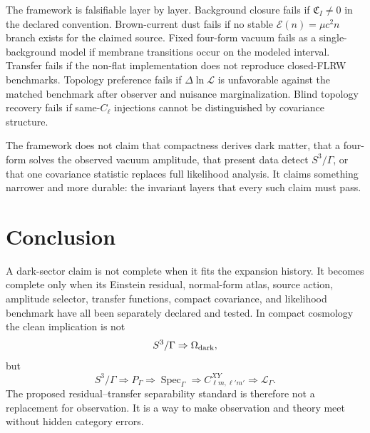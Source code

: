 \documentclass[
  aps,
  prd,
  reprint,
  superscriptaddress,
  floatfix,
  nofootinbib,
  longbibliography
]{revtex4-2}
\theoremstyle{plain}
\theoremstyle{definition}
\theoremstyle{remark}
\newcommand{\Spec}{\operatorname{Spec}}
\newcommand{\PG}{P_{\Gamma}}
\newcommand{\Ecal}{\mathcal E}
\newcommand{\Lcal}{\mathcal L}
\begin{document}
The framework is falsifiable layer by layer.  Background closure fails if \(\mathfrak C_I\ne0\) in the declared convention.  Brown-current dust fails if no stable \(\Ecal(n)=\mu c^2n\) branch exists for the claimed source.  Fixed four-form vacuum fails as a single-background model if membrane transitions occur on the modeled interval.  Transfer fails if the non-flat implementation does not reproduce closed-FLRW benchmarks.  Topology preference fails if \(\Delta\ln\Lcal\) is unfavorable against the matched benchmark after observer and nuisance marginalization.  Blind topology recovery fails if same-\(C_\ell\) injections cannot be distinguished by covariance structure.

The framework does not claim that compactness derives dark matter, that a four-form solves the observed vacuum amplitude, that present data detect \(S^3/\Gamma\), or that one covariance statistic replaces full likelihood analysis.  It claims something narrower and more durable: the invariant layers that every such claim must pass.

\section{Conclusion}

A dark-sector claim is not complete when it fits the expansion history.  It becomes complete only when its Einstein residual, normal-form atlas, source action, amplitude selector, transfer functions, compact covariance, and likelihood benchmark have all been separately declared and tested.  In compact cosmology the clean implication is not
\begin{equation}
S^3/\Gamma\Rightarrow\Omega_{\rm dark},
\end{equation}
but
\begin{equation}
\boxed{
S^3/\Gamma\Rightarrow \PG\Rightarrow\Spec_\Gamma\Rightarrow C^{XY}_{\ell m,\ell'm'}\Rightarrow \Lcal_\Gamma.
}
\end{equation}
The proposed residual--transfer separability standard is therefore not a replacement for observation.  It is a way to make observation and theory meet without hidden category errors.
\end{document}
